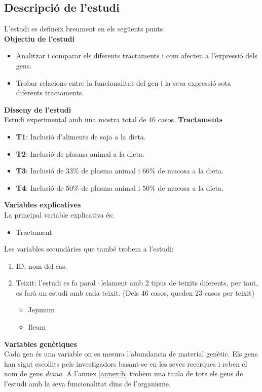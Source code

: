 \documentclass[english]{article}
\begin{document}
\subsection{Descripció de l'estudi}
L'estudi es defineix breument en els següents punts\\

\noindent\textbf{Objectiu de l'estudi}
\begin{itemize}
  \item Analitzar i comparar els diferents tractaments i com afecten a l'expressió dels gens.
  \item Trobar relacions entre la funcionalitat del gen i la seva expressió sota diferents tractaments.
\end{itemize}
\noindent\textbf{Disseny de l'estudi}\\
Estudi experimental amb una mostra total de 46 casos.
\noindent\textbf{Tractaments}
\begin{itemize}
  \item \textbf{T1}: Inclusió d'aliments de soja a la dieta.
  \item \textbf{T2}: Inclusió de plasma animal a la dieta.
  \item \textbf{T3}: Inclusió de $33\%$ de plasma animal i  $66\%$ de mucosa a la dieta.
  \item \textbf{T4}: Inclusió de $50\%$ de plasma animal i  $50\%$ de mucosa a la dieta.
\end{itemize}
\noindent\textbf{Variables explicatives}\\
La principal variable explicativa és:
\begin{itemize}
  \item Tractament
\end{itemize}
Les variables secundàries que també trobem a l'estudi:
\begin{enumerate}
  \item ID: nom del cas.
  \item Teixit: l'estudi es fa paral·lelament amb 2 tipus de teixits diferents, per tant, es farà un estudi amb cada teixit. (Dels 46 casos, queden 23 casos per teixit)
  \begin{itemize}
    \item Jejunum
    \item Ileum
  \end{itemize}
\end{enumerate}
\noindent\textbf{Variables genètiques}\\
Cada gen és una variable on es mesura l'abundancia de material genètic. Els gens han sigut escollits pels investigadors basant-se en les seves recerques i reben el nom de gens \textit{diana}. A l'annex \ref{annex:b} trobem una taula de tots els gens de l'estudi amb la seva funcionalitat dins de l'organisme.
\end{document}
